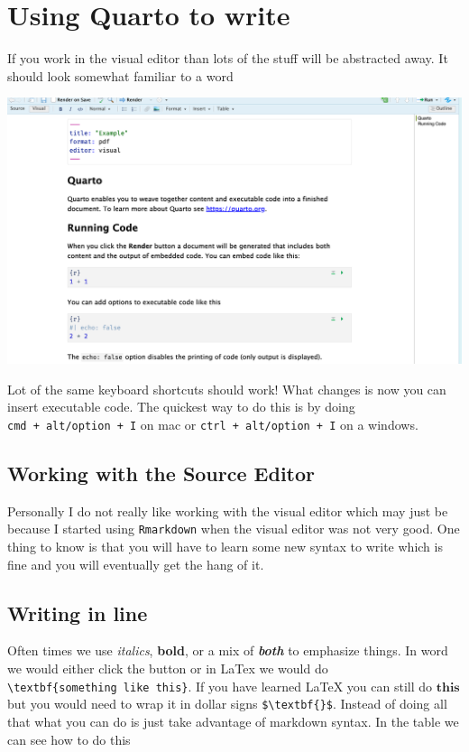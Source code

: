 \documentclass[
  letterpaper,
  DIV=11,
  numbers=noendperiod,
  oneside]{scrreprt}
\begin{document}
\hypertarget{using-quarto-to-write}{%
\section{Using Quarto to write}\label{using-quarto-to-write}}

If you work in the visual editor than lots of the stuff will be
abstracted away. It should look somewhat familiar to a word

\includegraphics[width=8.21in,height=\textheight]{figs/visual-default.png}

Lot of the same keyboard shortcuts should work! What changes is now you
can insert executable code. The quickest way to do this is by doing
\texttt{cmd\ +\ alt/option\ +\ I} on mac or
\texttt{ctrl\ +\ alt/option\ +\ I} on a windows.

\hypertarget{working-with-the-source-editor}{%
\subsection{Working with the Source
Editor}\label{working-with-the-source-editor}}

Personally I do not really like working with the visual editor which may
just be because I started using \texttt{Rmarkdown} when the visual
editor was not very good. One thing to know is that you will have to
learn some new syntax to write which is fine and you will eventually get
the hang of it.

\hypertarget{writing-in-line}{%
\subsection{Writing in line}\label{writing-in-line}}

Often times we use \emph{italics}, \textbf{bold}, or a mix of
\textbf{\emph{both}} to emphasize things. In word we would either click
the button or in LaTex we would do
\texttt{\textbackslash{}textbf\{something\ like\ this\}}. If you have
learned LaTeX you can still do \(\textbf{this}\) but you would need to
wrap it in dollar signs \texttt{\$\textbackslash{}textbf\{\}\$}. Instead
of doing all that what you can do is just take advantage of markdown
syntax. In the table we can see how to do this
\end{document}
